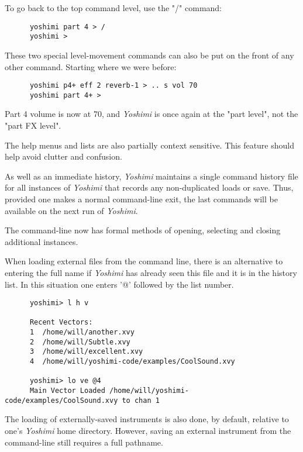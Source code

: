    To go back to the top command level, use the "/" command:

   \begin{verbatim}
      yoshimi part 4 > /
      yoshimi >
   \end{verbatim}

   These two special level-movement commands can also be put on the front of
   any other command.  Starting where we were before:

   \begin{verbatim}
      yoshimi p4+ eff 2 reverb-1 > .. s vol 70
      yoshimi part 4+ >
   \end{verbatim}

   Part 4 volume is now at 70, and \textsl{Yoshimi} is once again at the
   "part level", not the "part FX level".

   The help menus and lists are also partially context sensitive. This
   feature should help avoid clutter and confusion.

   As well as an immediate history, \textsl{Yoshimi} maintains a single
   command history file for all instances of \textsl{Yoshimi} that records
   any non-duplicated loads or save.  Thus, provided one makes a normal
   command-line exit, the last commands will be available on the next run of
   \textsl{Yoshimi}.

   The command-line now has formal methods of opening, selecting and closing
   additional instances.

   When loading external files from the command line, there is an alternative
   to entering the full name if \textsl{Yoshimi} has already seen this file
   and it is in the history list. In this situation one enters '@' followed
   by the list number.

   \begin{verbatim}
      yoshimi> l h v

      Recent Vectors:
      1  /home/will/another.xvy
      2  /home/will/Subtle.xvy
      3  /home/will/excellent.xvy
      4  /home/will/yoshimi-code/examples/CoolSound.xvy

      yoshimi> lo ve @4
      Main Vector Loaded /home/will/yoshimi-code/examples/CoolSound.xvy to chan 1
   \end{verbatim}

   The loading of externally-saved instruments is also done, by default,
   relative to one's \textsl{Yoshimi} home directory.  However, saving an
   external instrument from the command-line still requires a full pathname.

